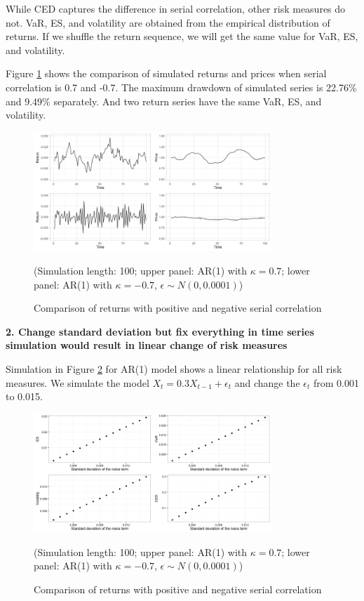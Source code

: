 \documentclass[11pt]{article}
\begin{document}
While CED captures the difference in serial correlation, other risk measures do not. VaR, ES, and volatility are obtained from the empirical distribution of returns. If we shuffle the return sequence, we will get the same value for VaR, ES, and volatility.

Figure \ref{fig:Comparison_pos_neg_autocorrelation} shows the comparison of simulated returns and prices when serial correlation is 0.7 and -0.7. The maximum drawdown of simulated series is 22.76\% and 9.49\% separately. And two return series have the same VaR, ES, and volatility.

\begin{figure}[H]
\centering
\includegraphics[width = 0.8\textwidth]{../figures/simulation/Comparison_pos_neg_autocorrelation}
\caption{Comparison of returns with positive and negative serial correlation}
(Simulation length: 100; upper panel: AR(1) with $\kappa=0.7$; lower panel: AR(1) with $\kappa=-0.7$, $\epsilon\sim N(0, 0.0001)$)
\label{fig:Comparison_pos_neg_autocorrelation}
\end{figure}

\textbf{2. Change standard deviation but fix everything in time series simulation would result in linear change of risk measures}

Simulation in Figure \ref{fig:change_std_simulation} for AR(1) model shows a linear relationship for all risk measures. We simulate the model $X_t = 0.3X_{t-1} + \epsilon_t$ and change the $\epsilon_t$ from 0.001 to 0.015.

\begin{figure}[H]
\centering
\includegraphics[width = 0.8\textwidth]{../figures/simulation/AR1_risk_measures_change_sd}
\caption{Comparison of returns with positive and negative serial correlation}
(Simulation length: 100; upper panel: AR(1) with $\kappa=0.7$; lower panel: AR(1) with $\kappa=-0.7$, $\epsilon\sim N(0, 0.0001)$)
\label{fig:change_std_simulation}
\end{figure}
\end{document}
